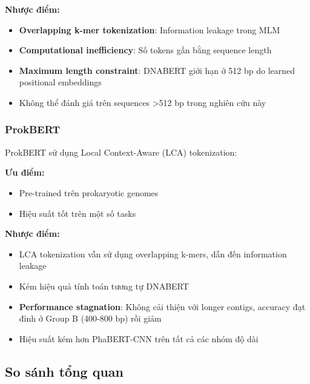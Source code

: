 \textbf{Nhược điểm:}
\begin{itemize}
    \item \textbf{Overlapping k-mer tokenization}: Information leakage trong MLM
    \item \textbf{Computational inefficiency}: Số tokens gần bằng sequence length
    \item \textbf{Maximum length constraint}: DNABERT giới hạn ở 512 bp do learned positional embeddings
    \item Không thể đánh giá trên sequences >512 bp trong nghiên cứu này
\end{itemize}

\subsubsection{ProkBERT}

ProkBERT \cite{ligeti2024prokbert} sử dụng Local Context-Aware (LCA) tokenization:

\textbf{Ưu điểm:}
\begin{itemize}
    \item Pre-trained trên prokaryotic genomes
    \item Hiệu suất tốt trên một số tasks
\end{itemize}

\textbf{Nhược điểm:}
\begin{itemize}
    \item LCA tokenization vẫn sử dụng overlapping k-mers, dẫn đến information leakage
    \item Kém hiệu quả tính toán tương tự DNABERT
    \item \textbf{Performance stagnation}: Không cải thiện với longer contigs, accuracy đạt đỉnh ở Group B (400-800 bp) rồi giảm
    \item Hiệu suất kém hơn PhaBERT-CNN trên tất cả các nhóm độ dài
\end{itemize}

\subsection{So sánh tổng quan}

